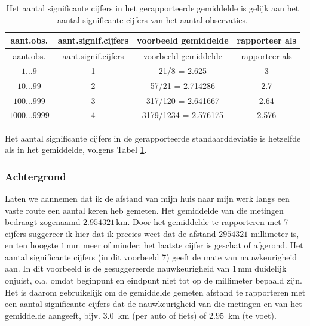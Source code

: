 \documentclass[
]{book}
\begin{document}
\begin{longtable}[]{@{}cccc@{}}
\caption{\label{tab:signifcijfersgemiddelde} Het aantal significante cijfers in het gerapporteerde gemiddelde is gelijk aan het aantal significante cijfers van het aantal observaties.}\tabularnewline
\toprule\noalign{}
aant.obs. & aant.signif.cijfers & voorbeeld gemiddelde & rapporteer als \\
\midrule\noalign{}
\endfirsthead
\toprule\noalign{}
aant.obs. & aant.signif.cijfers & voorbeeld gemiddelde & rapporteer als \\
\midrule\noalign{}
\endhead
\bottomrule\noalign{}
\endlastfoot
\(1\dots9\) & 1 & 21/8 = 2.625 & 3 \\
\(10\dots99\) & 2 & 57/21 = 2.714286 & 2.7 \\
\(100\dots999\) & 3 & 317/120 = 2.641667 & 2.64 \\
\(1000\dots9999\) & 4 & 3179/1234 = 2.576175 & 2.576 \\
\end{longtable}

Het aantal significante cijfers in de gerapporteerde standaarddeviatie
is hetzelfde als in het gemiddelde, volgens
Tabel \ref{tab:signifcijfersgemiddelde}.

\subsubsection{Achtergrond}\label{achtergrond}

Laten we aannemen dat ik de afstand van mijn huis naar mijn werk langs
een vaste route een aantal keren heb gemeten. Het gemiddelde van die
metingen bedraagt zogenaamd \(2.954321\) km. Door het gemiddelde te
rapporteren met 7 cijfers suggereer ik hier dat ik precies weet dat de
afstand \(2954321\) millimeter is, en ten hoogste \(1\) mm meer of minder:
het laatste cijfer is geschat of afgerond. Het aantal significante
cijfers (in dit voorbeeld 7) geeft de mate van nauwkeurigheid aan. In
dit voorbeeld is de gesuggereerde nauwkeurigheid van 1 mm duidelijk
onjuist, o.a. omdat beginpunt en eindpunt niet tot op de millimeter
bepaald zijn. Het is daarom gebruikelijk om de gemiddelde gemeten
afstand te rapporteren met een aantal significante cijfers dat de
nauwkeurigheid van die metingen en van het gemiddelde aangeeft, bijv.
\(3.0\)~km (per auto of fiets) of \(2.95\)~km (te voet).
\end{document}
